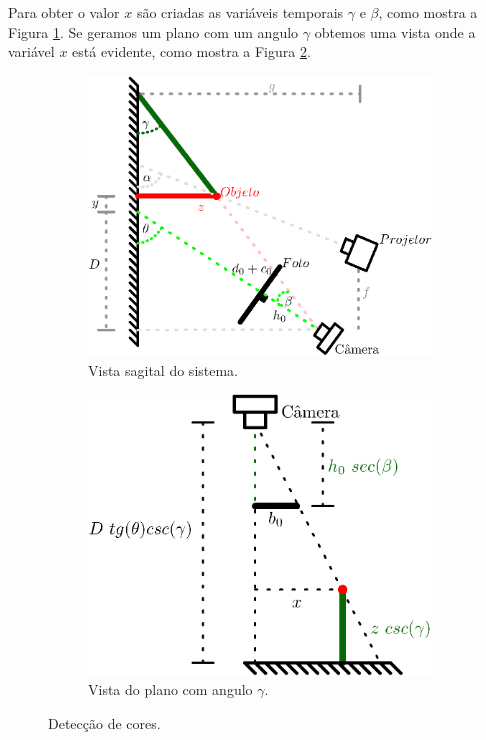 \documentclass[a4paper, 12pt]{article}
\begin{document}
Para obter o valor $x$ são criadas as variáveis temporais $\gamma$ e $\beta$, como mostra 
a Figura \ref{fig:blocos2:sagital}.
Se geramos um plano com um angulo $\gamma$
obtemos uma vista onde a variável $x$ está evidente, como mostra a Figura \ref{fig:blocos2:plano}.
\begin{figure}[!h]
     \centering
     \begin{subfigure}[b]{0.475\textwidth}
         \centering
         \includegraphics[width=\textwidth]{Diagrama5.eps}
         \caption{Vista sagital do sistema.}
         \label{fig:blocos2:sagital}
     \end{subfigure}
     \hfill
     \begin{subfigure}[b]{0.475\textwidth}
         \centering
         \includegraphics[width=\textwidth]{Diagrama4.eps}
         \caption{Vista do plano com angulo $\gamma$.}
         \label{fig:blocos2:plano}
     \end{subfigure}
\caption{Detecção de cores.}
\label{fig:blocos2}
\end{figure}
\end{document}
